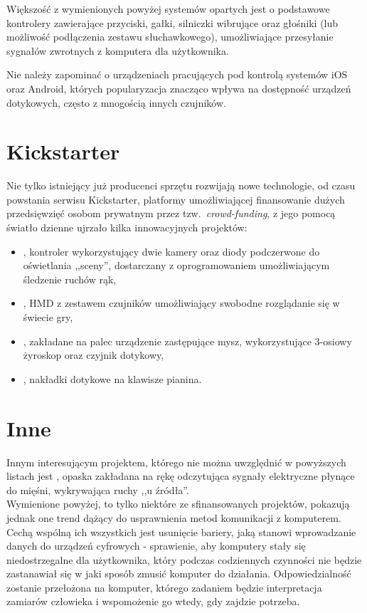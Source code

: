 Większość z wymienionych powyżej systemów opartych jest o podstawowe kontrolery zawierające przyciski, gałki, silniczki wibrujące oraz głośniki (lub możliwość podłączenia zestawu słuchawkowego), umożliwiające przesyłanie sygnałów zwrotnych z komputera dla użytkownika.

Nie należy zapominać o urządzeniach pracujących pod kontrolą systemów iOS oraz Android, których popularyzacja znacząco wpływa na dostępność urządzeń dotykowych, często z mnogością innych czujników.\\

\section{Kickstarter}

Nie tylko istniejący już producenci sprzętu rozwijają nowe technologie, od czasu powstania serwisu Kickstarter, platformy umożliwiającej finansowanie dużych przedsięwzięć osobom prywatnym przez tzw.\ \textit{crowd-funding}, z jego pomocą światło dzienne ujrzało kilka innowacyjnych projektów:
\begin{itemize}
 \item {}, kontroler wykorzystujący dwie kamery oraz diody podczerwone do oświetlania ,,sceny'', dostarczany z oprogramowaniem umożliwiającym śledzenie ruchów rąk,
 \item {}, HMD z zestawem czujników umożliwiający swobodne rozglądanie się w świecie gry,
 \item {}, zakładane na palec urządzenie zastępujące mysz, wykorzystujące 3-osiowy żyroskop oraz czyjnik dotykowy,
 \item {}, nakładki dotykowe na klawisze pianina.\\
\end{itemize}

\section{Inne}

Innym interesującym projektem, którego nie można uwzględnić w powyższych listach jest , opaska zakładana na rękę odczytująca sygnały elektryczne płynące do mięśni, wykrywająca ruchy ,,u źródła''.\\

Wymienione powyżej, to tylko niektóre ze sfinansowanych projektów, pokazują jednak one trend dążący do usprawnienia metod komunikacji z komputerem. Cechą wspólną ich wszystkich jest usunięcie bariery, jaką stanowi wprowadzanie danych do urządzeń cyfrowych - sprawienie, aby komputery stały się niedostrzegalne dla użytkownika, który podczas codziennych czynności nie będzie zastanawiał się w jaki sposób zmusić komputer do działania. Odpowiedzialność zostanie przełożona na komputer, którego zadaniem będzie interpretacja zamiarów człowieka i wspomożenie go wtedy, gdy zajdzie potrzeba.\\

